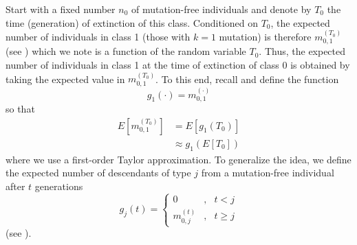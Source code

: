 \documentclass[9pt,lineno]{elife}
\begin{document}
Start with a fixed number $n_{0}$ of mutation-free individuals and denote by $T_{0}$ the time (generation) of extinction of this class. Conditioned on $T_{0}$, the expected number of individuals in class 1 (those with $k=1$ mutation) is therefore $m_{0,1}^{(T_0)}$
% 
% 
(see )
which we note is a function of the random variable $T_{0}$. Thus, the expected number of individuals in class 1 at the time of extinction of class 0 is obtained by taking the expected value in $m_{0,1}^{(T_0)}$. To this end, recall  and define the function 
%
\begin{equation*}
g_1(\cdot)=m_{0,1}^{(\cdot)}
\end{equation*}
%
so that 
%
\begin{align*}
%
E\left[m_{0,1}^{(T_{0})}\right] &=  E[g_{1}(T_{0})]\\
&\approx  g_{1}\left(E[T_{0}]\right)
%
\end{align*}
%
where we use a first-order Taylor approximation. To generalize the idea, 
we define the 
expected number of descendants of type $j$ from a mutation-free individual after $t$ generations
%
\begin{equation}
g_{j}(t) = \left\{\begin{array}{lll}
%
    0              & , & t<j       \\ [4pt]
	m^{(t)}_{0, j} & , & t \geq j
    \end{array}
%
\right. 
\label{eq:gj}
\end{equation}
%
(see ).
\end{document}
